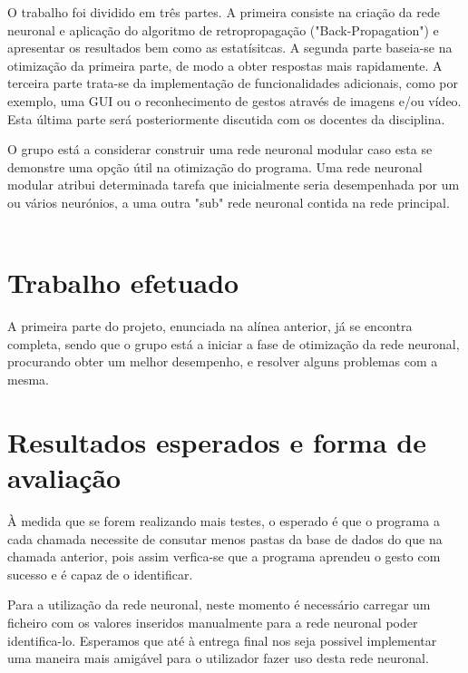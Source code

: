 \documentclass[10pt,a4paper]{article}
\begin{document}
O trabalho foi dividido em três partes. 
A primeira consiste na criação da rede neuronal e aplicação do algoritmo de retropropagação ("Back-Propagation") e apresentar os resultados bem como as estatísitcas.
A segunda parte baseia-se na otimização da primeira parte, de modo a obter respostas mais rapidamente.
A terceira parte trata-se da implementação de funcionalidades adicionais, como por exemplo, uma GUI ou o reconhecimento de gestos através de imagens e/ou vídeo. Esta última parte será posteriormente discutida com os docentes da disciplina.

O grupo está a considerar construir uma rede neuronal modular caso esta se demonstre uma opção útil na otimização do programa. Uma rede neuronal modular atribui determinada tarefa que inicialmente seria desempenhada por um ou vários neurónios, a uma outra "sub" rede neuronal contida na rede principal.
\\ \\

\section{Trabalho efetuado}
\subitem

A primeira parte do projeto, enunciada na alínea anterior, já se encontra completa, sendo que o grupo está a iniciar a fase de otimização da rede neuronal, procurando obter um melhor desempenho, e resolver alguns problemas com a mesma.

\section{Resultados esperados e forma de avaliação}
\subitem

À medida que se forem realizando mais testes, o esperado é que o programa a cada chamada necessite de consutar menos pastas da base de dados do que na chamada anterior, pois assim verfica-se que a programa aprendeu o gesto com sucesso e é capaz de o identificar.

Para a utilização da rede neuronal, neste momento é necessário carregar um ficheiro com os valores inseridos manualmente para a rede neuronal poder identifica-lo. Esperamos que até à entrega final nos seja possivel implementar uma maneira mais amigável para o utilizador fazer uso desta rede neuronal.
\\ \\ \\ \\ \\
\end{document}
